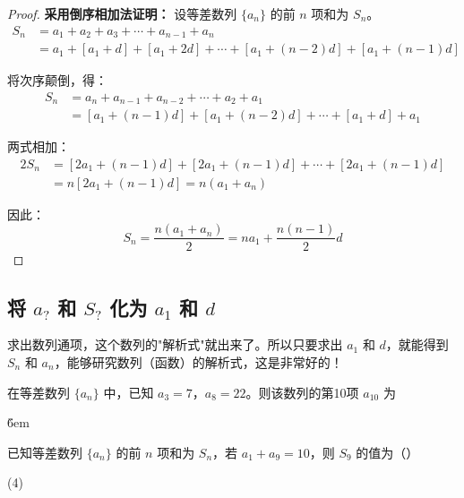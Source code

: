 \begin{proof}
    \textbf{采用倒序相加法证明：} 设等差数列 $\{a_n\}$ 的前 $n$ 项和为 $S_n$。
    \begin{align}
        S_n & = a_1 + a_2 + a_3 + \cdots + a_{n-1} + a_n                                \\
            & = a_1 + [a_1 + d] + [a_1 + 2d] + \cdots + [a_1 + (n-2)d] + [a_1 + (n-1)d]
    \end{align}

    将次序颠倒，得：
    \begin{align}
        S_n & = a_n + a_{n-1} + a_{n-2} + \cdots + a_2 + a_1               \\
            & = [a_1 + (n-1)d] + [a_1 + (n-2)d] + \cdots + [a_1 + d] + a_1
    \end{align}

    两式相加：
    \begin{align}
        2S_n & = [2a_1 + (n-1)d] + [2a_1 + (n-1)d] + \cdots + [2a_1 + (n-1)d] \\
             & = n[2a_1 + (n-1)d] = n(a_1 + a_n)
    \end{align}

    因此：
    $$S_n = \frac{n(a_1+a_n)}{2} = na_1 + \frac{n(n-1)}{2}d$$
\end{proof}

\subsection{将 $a_{?}$ 和 $S_{?}$ 化为 $a_1$ 和 $d$}

\begin{tips}
    求出数列通项，这个数列的"解析式"就出来了。所以只要求出 $a_1$ 和 $d$，就能得到 $S_n$ 和 $a_n$，能够研究数列（函数）的解析式，这是非常好的！
\end{tips}

\begin{example}
    在等差数列 $\{a_n\}$ 中，已知 $a_3 = 7$，$a_8 = 22$。则该数列的第10项 $a_{10}$ 为 \underline{\qquad}
\end{example}

\v{6em}

\begin{example}
    已知等差数列 $\{a_n\}$ 的前 $n$ 项和为 $S_n$，若 $a_1+a_9 = 10$，则 $S_9$ 的值为（\qquad）
    \begin{tasks}(4)
    \end{tasks}
\end{example}

